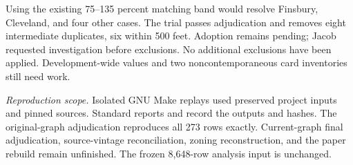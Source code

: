 Using the existing 75--135 percent matching band would resolve Finsbury,
Cleveland, and four other cases. The trial passes adjudication and removes
eight intermediate duplicates, six within 500 feet. Adoption remains pending;
Jacob requested investigation before exclusions. No additional exclusions
have been applied. Development-wide values and two noncontemporaneous card
inventories still need work.

\textit{Reproduction scope.} Isolated GNU Make replays used preserved project
inputs and pinned sources. Standard reports and
 record the outputs and hashes. The original-graph
adjudication reproduces all 273 rows exactly. Current-graph final adjudication,
source-vintage reconciliation, zoning reconstruction, and the paper rebuild
remain unfinished. The frozen 8,648-row analysis input is unchanged.
